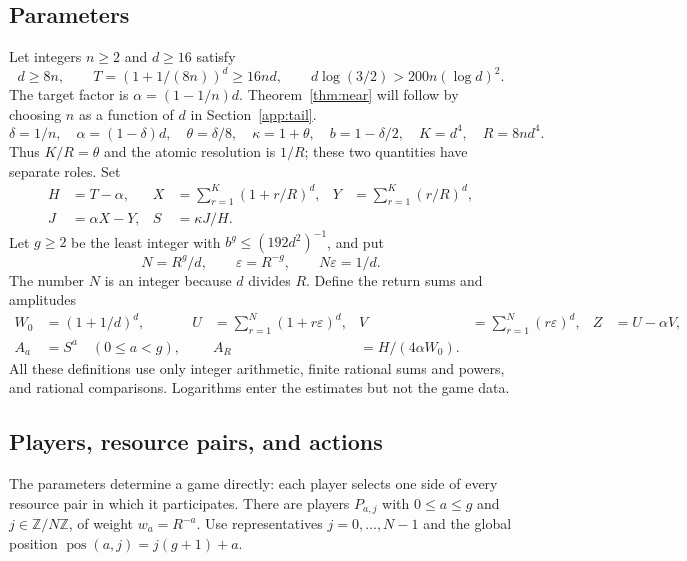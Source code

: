 \documentclass[11pt]{article}
\theoremstyle{definition}
\DeclareMathOperator{\pos}{pos}
\begin{document}
\subsection{Parameters}
Let integers $n\ge2$ and $d\ge16$ satisfy
\begin{equation}\label{eq:uniformconditions}
 d\ge8n,\qquad T=(1+1/(8n))^d\ge16nd,\qquad
 d\log(3/2)>200n(\log d)^2.
\end{equation}
The target factor is $\alpha=(1-1/n)d$. Theorem~\ref{thm:near} will follow by choosing $n$ as a function of $d$ in Section~\ref{app:tail}.
\begin{equation}\label{eq:appfirstparams}
 \delta=1/n,\quad\alpha=(1-\delta)d,\quad
 \theta=\delta/8,\quad\kappa=1+\theta,\quad
 b=1-\delta/2,\quad K=d^4,\quad R=8nd^4.
\end{equation}
Thus $K/R=\theta$ and the atomic resolution is $1/R$; these two quantities have separate roles. Set
\begin{align}
 H&=T-\alpha,&
 X&=\sum_{r=1}^K(1+r/R)^d,&
 Y&=\sum_{r=1}^K(r/R)^d,\label{eq:appXY}\\
 J&=\alpha X-Y,&S&=\kappa J/H.\nonumber
\end{align}
Let $g\ge2$ be the least integer with $b^g\le(192d^2)^{-1}$, and put
\begin{equation}\label{eq:appdepthparams}
 N=R^g/d,\qquad\varepsilon=R^{-g},\qquad N\varepsilon=1/d.
\end{equation}
The number $N$ is an integer because $d$ divides $R$. Define the return sums and amplitudes
\begin{align}
 W_0&=(1+1/d)^d,&
 U&=\sum_{r=1}^N(1+r\varepsilon)^d,&
 V&=\sum_{r=1}^N(r\varepsilon)^d,&Z&=U-\alpha V,\label{eq:appreturn}\\
 A_a&=S^a\quad(0\le a<g),&&
 A_R&=H/(4\alpha W_0).\nonumber
\end{align}
All these definitions use only integer arithmetic, finite rational sums and powers, and rational comparisons. Logarithms enter the estimates but not the game data.

\subsection{Players, resource pairs, and actions}\label{app:resources}
The parameters determine a game directly: each player selects one side of every resource pair in which it participates.
There are players $P_{a,j}$ with $0\le a\le g$ and $j\in\mathbb Z/N\mathbb Z$, of weight $w_a=R^{-a}$. Use representatives $j=0,\ldots,N-1$ and the global position $\pos(a,j)=j(g+1)+a$.
\end{document}
